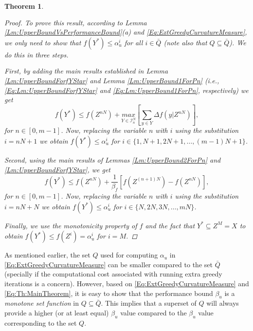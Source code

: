 \documentclass[letterpaper, 10 pt, conference]{ieeeconf}
\newtheorem{theorem}{Theorem}
\begin{document}
{\begin{theorem}
\begin{proof}
To prove this result, according to Lemma \ref{Lm:UpperBoundVsPerformanceBound}(a) and \eqref{Eq:ExtGreedyCurvatureMeasure}, we only need to show that $f(Y^*) \leq \alpha_u^i$ for all $i \in \bar{Q}$ (note also that $Q\subseteq \bar{Q}$). We do this in three steps.

First, by adding the main results established in Lemma \ref{Lm:UpperBoundForfYStar} and Lemma \ref{Lm:UpperBound1ForPn} (i.e., \eqref{Eq:Lm:UpperBoundForfYStar} and \eqref{Eq:Lm:UpperBound1ForPn}, respectively) we get 
\begin{equation}
    f(Y^*) \leq f(Z^{nN}) +  \underset{Y\in\mathcal{I}^N_n}{max} \left[ \sum_{y\in Y} \Delta f(y\vert Z^{nN}) \right],
\end{equation}
for $n\in[0,m-1]$. Now, replacing the variable $n$ with $i$ using the substitution $i=nN+1$ we obtain $f(Y^*) \leq \alpha^i_u$ for $i\in\{1,N+1,2N+1,\ldots,(m-1)N+1\}$.

Second, using the main results of Lemmas \ref{Lm:UpperBound2ForPn} and \ref{Lm:UpperBoundForfYStar}, we get
\begin{equation}
    f(Y^*) \leq f(Z^{nN}) + \frac{1}{\beta_f}\left[ f(Z^{(n+1)N})-f(Z^{nN})\right],
\end{equation}
for $n\in[0,m-1]$. Now, replacing the variable $n$ with $i$ using the substitution $i=nN+N$ we obtain $f(Y^*) \leq \alpha^i_u$ for $i\in\{N,2N,3N,\ldots,mN\}$.

Finally, we use the monotonicity property of $f$ and the fact that $Y^* \subseteq Z^M=X$ to obtain $f(Y^*) \leq f(Z^i) = \alpha^i_u$ for $i=M$. 
\end{proof}
\end{theorem}








As mentioned earlier, the set $Q$ used for computing $\alpha_u$ in \eqref{Eq:ExtGreedyCurvatureMeasure} can be smaller compared to the set $\bar{Q}$ (specially if the computational cost associated with running extra greedy iterations is a concern). However, based on \eqref{Eq:ExtGreedyCurvatureMeasure} and \eqref{Eq:Th:MainTheorem}, it is easy to show that the performance bound $\beta_u$ is a \emph{monotone set function} in $Q \subseteq \bar{Q}$. This implies that a superset of $Q$ will always provide a higher (or at least equal) $\beta_u$ value compared to the $\beta_u$ value corresponding to the set $Q$.



}
\end{document}
